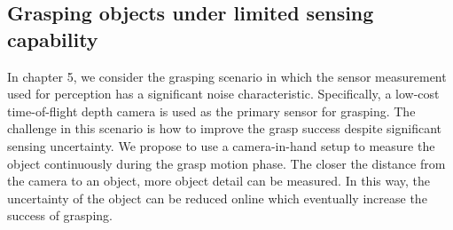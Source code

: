 \subsection{Grasping objects under limited sensing capability}
\label{chap:grasplimitsensing}		
In chapter 5, we consider the grasping scenario in which the sensor measurement used for perception has a significant noise characteristic. Specifically, a low-cost time-of-flight depth camera is used as the primary sensor for grasping. The challenge in this scenario is how to improve the grasp success despite significant sensing uncertainty. We propose to use a camera-in-hand setup to  measure the object continuously during the grasp motion phase. The closer the distance from the camera to an object, more object detail can be measured. In this way, the uncertainty of the object can be reduced online which eventually increase the success of grasping.  

